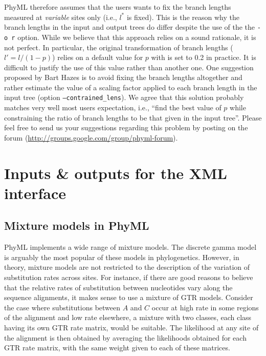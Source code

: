 \documentclass[a4paper,12pt]{article}
\newcommand{\x}[1]{\texttt{#1}}
\begin{document}
PhyML therefore  assumes that the  users wants  to fix the  branch lengths measured  at {\em variable}
sites only  (i.e., $l^{*}$ is  fixed). This is the  reason why the  branch lengths in the  input and
output trees  do differ  despite the  use of the  the \x{-o  r} option. While  we believe  that this
approach relies on a sound rationale, it  is not perfect. In particular, the original transformation
of  branch lengths  ($l' =  l/(1-p)$) relies  on a  default  value for  $p$ with  is set  to 0.2  in
practice. It is difficult  to justify the use of this value rather  than another one. One suggestion
proposed by  Bart Hazes is  to avoid fixing  the branch lengths  altogether and rather  estimate the
value  of   a  scaling  factor   applied  to   each  branch  length   in  the  input   tree  (option
\x{--contrained\_lens}).  We  agree  that  this  solution  probably matches  very  well  most  users
expectation, i.e., ``find the  best value of $p$ while constraining the ratio  of branch lengths to be
that given in the input tree''. Please feel free to send us your suggestions regarding this problem
by posting on the forum (\url{http://groups.google.com/group/phyml-forum}).


\section{Inputs \& outputs for the XML interface }\label{sec:xmlio}

\subsection{Mixture models in PhyML}\label{sec:mixtures}

PhyML implements a wide range of mixture models. The discrete gamma model \cite{yang94b} is arguably
the  most popular  of these  models in  phylogenetics. However,  in theory,  mixture models  are not
restricted to the description of the variation  of substitution rates across sites. For instance, if
there are good reasons  to believe that the relative rates of  substitution between nucleotides vary
along the  sequence alignments, it  makes sense to  use a mixture of  GTR models. Consider  the case
where substitutions between $A$ and $C$ occur at  high rate in some regions of the alignment and low
rate elsewhere,  a mixture with two  classes, each class having  its own GTR rate  matrix, would be
suitable. The likelihood at any site of  the alignment is then obtained by averaging the likelihoods
obtained for each GTR rate matrix, with the same weight given to each of these matrices.
\end{document}
